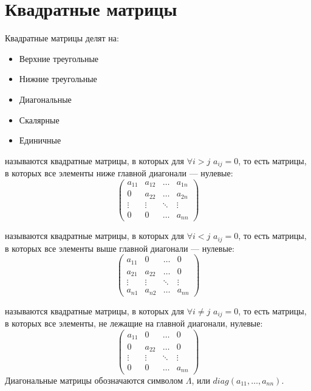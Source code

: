\section{Квадратные матрицы}
Квадратные матрицы делят на:
\begin{itemize}
\item Верхние треугольные
\item Нижние треугольные
\item Диагональные
\item Скалярные
\item Единичные
\end{itemize}
\begin{opred}
 называются квадратные матрицы, в которых для $\forall{}i>j$ $a_{ij}=0$, то есть матрицы, в которых все элементы ниже главной диагонали --- нулевые:\newline
{$$
\begin{pmatrix}
a_{11}& a_{12}& \ldots& a_{1n} \\
0&      a_{22}& \ldots& a_{2n} \\
\vdots& \vdots& \ddots& \vdots \\
0&      0&      \ldots& a_{nn}
\end{pmatrix}
$$}
\end{opred}
\begin{opred}
 называются квадратные матрицы, в которых для $\forall{}i<j$ $a_{ij}=0$, то есть матрицы, в которых все элементы выше главной диагонали --- нулевые:\newline
{$$
\begin{pmatrix}
a_{11}& 0&      \ldots& 0      \\
a_{21}& a_{22}& \ldots& 0      \\
\vdots& \vdots& \ddots& \vdots \\
a_{n1}& a_{n2}& \ldots& a_{nn}
\end{pmatrix}
$$}
\end{opred}
\begin{opred}
 называются квадратные матрицы, в которых для $\forall{}i\ne{}j$ $a_{ij}=0$, то есть матрицы, в которых все элементы, не лежащие на главной диагонали, нулевые:\newline
$$
\begin{pmatrix}
a_{11}& 0&      \ldots& 0      \\
0&      a_{22}& \ldots& 0      \\
\vdots& \vdots& \ddots& \vdots \\
0&      0&      \ldots& a_{nn}
\end{pmatrix}
$$
Диагональные матрицы обозначаются символом $\Lambda$, или $diag(a_{11},\ldots,a_{nn})$.
\end{opred}
